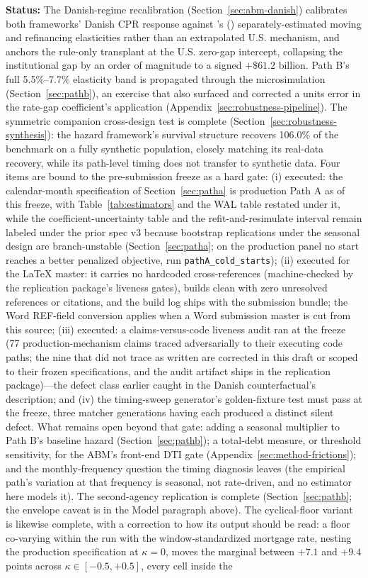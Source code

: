\documentclass[12pt]{article}
\newcommand{\citepos}[1]{\citeauthor{#1}'s (\citeyear{#1})}
\begin{document}
\textbf{Status:} The Danish-regime recalibration (Section~\ref{sec:abm-danish}) calibrates both frameworks' Danish CPR response against \citepos{berger2026} separately-estimated moving and refinancing elasticities rather than an extrapolated U.S. mechanism, and anchors the rule-only transplant at the U.S. zero-gap intercept, collapsing the institutional gap by an order of magnitude to a signed $+\$61.2$ billion. Path B's full 5.5\%--7.7\% elasticity band is propagated through the microsimulation (Section~\ref{sec:pathb}), an exercise that also surfaced and corrected a units error in the rate-gap coefficient's application (Appendix~\ref{sec:robustness-pipeline}). The symmetric companion cross-design test is complete (Section~\ref{sec:robustness-synthesis}): the hazard framework's survival structure recovers 106.0\% of the benchmark on a fully synthetic population, closely matching its real-data recovery, while its path-level timing does not transfer to synthetic data. Four items are bound to the pre-submission freeze as a hard gate: (i) executed: the calendar-month specification of Section~\ref{sec:patha} is production Path A as of this freeze, with Table~\ref{tab:estimators} and the WAL table restated under it, while the coefficient-uncertainty table and the refit-and-resimulate interval remain labeled under the prior spec v3 because bootstrap replications under the seasonal design are branch-unstable (Section~\ref{sec:patha}; on the production panel no start reaches a better penalized objective, run \texttt{pathA\_cold\_starts}); (ii) executed for the LaTeX master: it carries no hardcoded cross-references (machine-checked by the replication package's liveness gates), builds clean with zero unresolved references or citations, and the build log ships with the submission bundle; the Word REF-field conversion applies when a Word submission master is cut from this source; (iii) executed: a claims-versus-code liveness audit ran at the freeze (77 production-mechanism claims traced adversarially to their executing code paths; the nine that did not trace as written are corrected in this draft or scoped to their frozen specifications, and the audit artifact ships in the replication package)---the defect class earlier caught in the Danish counterfactual's description; and (iv) the timing-sweep generator's golden-fixture test must pass at the freeze, three matcher generations having each produced a distinct silent defect. What remains open beyond that gate: adding a seasonal multiplier to Path B's baseline hazard (Section~\ref{sec:pathb}); a total-debt measure, or threshold sensitivity, for the ABM's front-end DTI gate (Appendix~\ref{sec:method-frictions}); and the monthly-frequency question the timing diagnosis leaves (the empirical path's variation at that frequency is seasonal, not rate-driven, and no estimator here models it). The second-agency replication is complete (Section~\ref{sec:pathb}; the envelope caveat is in the Model paragraph above). The cyclical-floor variant is likewise complete, with a correction to how its output should be read: a floor co-varying within the run with the window-standardized mortgage rate, nesting the production specification at $\kappa = 0$, moves the marginal between $+7.1$ and $+9.4$ points across $\kappa \in [-0.5, +0.5]$, every cell inside the 
\end{document}
